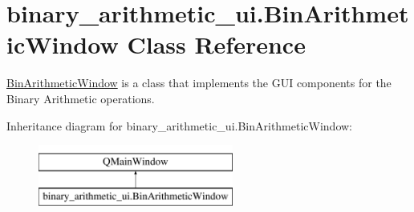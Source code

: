 \hypertarget{classbinary__arithmetic__ui_1_1_bin_arithmetic_window}{}\section{binary\+\_\+arithmetic\+\_\+ui.\+Bin\+Arithmetic\+Window Class Reference}
\label{classbinary__arithmetic__ui_1_1_bin_arithmetic_window}


\hyperlink{classbinary__arithmetic__ui_1_1_bin_arithmetic_window}{Bin\+Arithmetic\+Window} is a class that implements the G\+UI components for the Binary Arithmetic operations.  


Inheritance diagram for binary\+\_\+arithmetic\+\_\+ui.\+Bin\+Arithmetic\+Window\+:\begin{figure}[H]
\begin{center}
\leavevmode
\includegraphics[height=2.000000cm]{classbinary__arithmetic__ui_1_1_bin_arithmetic_window}
\end{center}
\end{figure}
